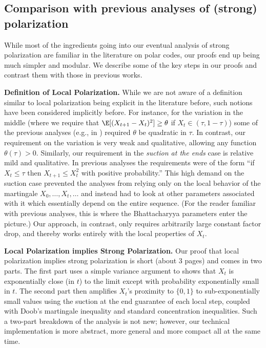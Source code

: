 \documentclass[11pt]{article}
\begin{document}
\subsection{Comparison with previous analyses of (strong) polarization}

While most of the ingredients going into our eventual analysis of strong polarization are familiar in the literature on polar codes, our proofs end up being much simpler and modular. We describe some of the key steps in our proofs and contrast them with those in previous works.


\medskip\noindent \textbf{Definition of Local Polarization.}
While we are not aware of a definition similar to local polarization being explicit in the literature before, such notions have been considered implicitly before.
For instance, for the variation in the middle (where we require that $\E[(X_{t+1}-X_t)^2] \geq \theta$ if $X_t \in (\tau,1-\tau)$)
some of the previous analyses (e.g., in \cite{GX15,GV15}) required  $\theta$ be quadratic in $\tau$.
In contrast, our requirement on the variation is very weak and qualitative, allowing any function $\theta(\tau) > 0$. Similarly, our requirement in the {\em suction at the ends} case is relative mild and qualitative. In previous analyses the requirements were of the form ``if $X_t \leq \tau$ then $X_{t+1} \leq X_t^2$ with positive probability.'' This high demand on the suction case prevented the analyses from relying only on the local behavior of the martingale $X_0,\ldots,X_t,\ldots$ and instead had to look at other parameters associated with it which essentially depend on the entire sequence. (For the reader familiar with previous analyses, this is where the Bhattacharyya parameters enter the picture.)
Our approach, in contrast, only requires arbitrarily large constant factor drop, and thereby works entirely with the local properties of $X_t$.

\medskip\noindent\textbf{Local Polarization implies Strong Polarization.}
Our proof that local polarization implies strong polarization is short (about 3 pages) and comes in two parts. The first part uses a simple variance argument to shows that $X_t$ is exponentially close (in $t$) to the limit except with probability exponentially small in $t$. The second part then amplifies $X_t$'s proximity to $\{0,1\}$ to sub-exponentially small values using the suction at the end guarantee of each local step, coupled with Doob's martingale inequality and standard concentration inequalities.
Such a two-part breakdown of the analysis is not new; however, our technical implementation is more abstract, more general and more compact all at the same time.
\end{document}
